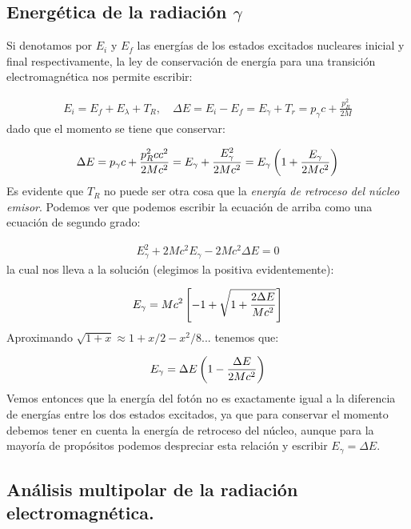 \subsection{Energética de la radiación $\gamma$}

Si denotamos por $E_i$ y $E_f$ las energías de los estados excitados nucleares inicial y final respectivamente, la ley de conservación de energía para una transición electromagnética nos permite escribir:

\begin{eqnarray*}
	E_i = E_f + E_\lambda + T_R, \quad \Delta E = E_i - E_f = E_\gamma + T_r = p_\gamma c+ \frac{p^2_R}{2M}  
\end{eqnarray*}
dado que el momento se tiene que conservar:

\begin{eqnarray*}
	\Delta E = p_\gamma c+ \frac{p^2_Rc c^2}{2Mc^2} =E_\gamma + \frac{E_\gamma^2}{2Mc^2} = E_\gamma \left( 1+\frac{E_\gamma}{2Mc^2} \right)
\end{eqnarray*}
Es evidente que $T_R$ no puede ser otra cosa que la \textit{energía de retroceso del núcleo emisor}. Podemos ver que podemos escribir la ecuación de arriba como una ecuación de segundo grado:

\begin{eqnarray*}
	E_\gamma^2 +2 Mc^2 E_\gamma - 2Mc^2 \Delta E = 0 
\end{eqnarray*}
la cual nos  lleva a la solución (elegimos la positiva evidentemente):

\begin{eqnarray}
	E_\gamma = Mc^2 \left[ -1+\sqrt{1+\frac{2\Delta E}{Mc^2}} \right]
\end{eqnarray}
Aproximando $\sqrt{1+x} \approx 1+x/2-x^2/8...$ tenemos que:

\begin{eqnarray}
	E_\gamma = \Delta E \left( 1-\frac{\Delta E}{2Mc^2} \right)
\end{eqnarray}
Vemos entonces que la energía del fotón no es exactamente igual a la diferencia de energías entre los dos estados excitados, ya que para conservar el momento debemos tener en cuenta la energía de retroceso del núcleo, aunque para la mayoría de propósitos podemos despreciar esta relación y escribir $E_\gamma = \Delta  E$.

\subsection{Análisis multipolar de la radiación electromagnética.}


